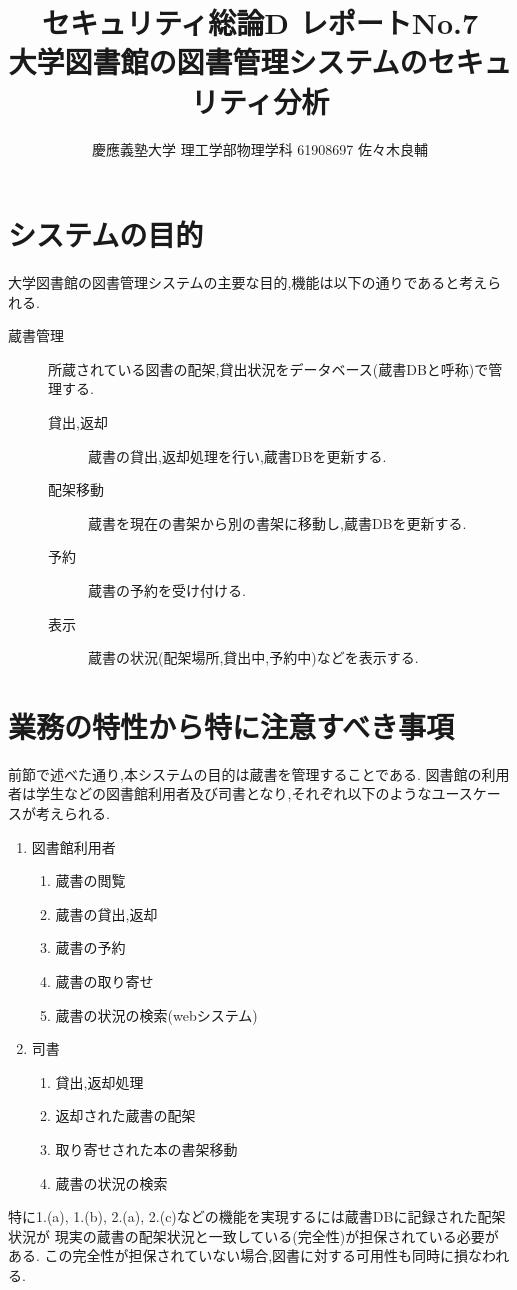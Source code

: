 \documentclass[uplatex,a4j,11pt,dvipdfmx]{jsarticle}
\begin{document}
\title{セキュリティ総論D レポートNo.7\\
\large 大学図書館の図書管理システムのセキュリティ分析}
\author{慶應義塾大学 理工学部物理学科 61908697 佐々木良輔}
\date{}
\maketitle

\section{システムの目的}
大学図書館の図書管理システムの主要な目的,機能は以下の通りであると考えられる.
\begin{description}
  \item[蔵書管理] 所蔵されている図書の配架,貸出状況をデータベース(蔵書DBと呼称)で管理する.
  \begin{description}
    \item[貸出,返却] 蔵書の貸出,返却処理を行い,蔵書DBを更新する.
    \item[配架移動] 蔵書を現在の書架から別の書架に移動し,蔵書DBを更新する.
    \item[予約] 蔵書の予約を受け付ける. 
    \item[表示] 蔵書の状況(配架場所,貸出中,予約中)などを表示する.
  \end{description}
\end{description}
\section{業務の特性から特に注意すべき事項}
前節で述べた通り,本システムの目的は蔵書を管理することである.
図書館の利用者は学生などの図書館利用者及び司書となり,それぞれ以下のようなユースケースが考えられる.
\begin{enumerate}
  \item 図書館利用者
  \begin{enumerate}
    \item 蔵書の閲覧
    \item 蔵書の貸出,返却
    \item 蔵書の予約
    \item 蔵書の取り寄せ
    \item 蔵書の状況の検索(webシステム)
  \end{enumerate}
  \item 司書
  \begin{enumerate}
    \item 貸出,返却処理
    \item 返却された蔵書の配架
    \item 取り寄せされた本の書架移動
    \item 蔵書の状況の検索
  \end{enumerate}
\end{enumerate}
特に1.(a), 1.(b), 2.(a), 2.(c)などの機能を実現するには蔵書DBに記録された配架状況が
現実の蔵書の配架状況と一致している(完全性)が担保されている必要がある.
この完全性が担保されていない場合,図書に対する可用性も同時に損なわれる.
\end{document}
